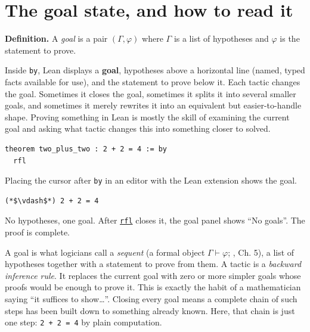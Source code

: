 \section{The goal state, and how to read it}\label{sec:05-tactics:01-goal-state:1}

\textbf{Definition.} A \emph{goal} is a pair \((\Gamma, \varphi)\) where \(\Gamma\) is a list of hypotheses and \(\varphi\) is the statement to prove.

Inside \texttt{by}, Lean displays a \textbf{goal}, hypotheses above a horizontal line (named, typed facts available for use), and the statement to prove below it. Each tactic changes the goal. Sometimes it closes the goal, sometimes it splits it into several smaller goals, and sometimes it merely rewrites it into an equivalent but easier-to-handle shape. Proving something in Lean is mostly the skill of examining the current goal and asking what tactic changes this into something closer to solved.

\begin{lstlisting}
theorem two_plus_two : 2 + 2 = 4 := by
  rfl
\end{lstlisting}

Placing the cursor after \texttt{by} in an editor with the Lean extension shows the goal.

\begin{lstlisting}
(*$\vdash$*) 2 + 2 = 4
\end{lstlisting}

No hypotheses, one goal. After \href{https://lean-lang.org/doc/reference/latest/Tactic-Proofs/Tactic-Reference/}{\texttt{rfl}} closes it, the goal panel shows ``No goals''. The proof is complete.

\begin{mathreading}

A goal is what logicians call a \emph{sequent} (a formal object \(\Gamma \vdash \varphi\); \cite{Pierce2002}, Ch. 5), a list of hypotheses together with a statement to prove from them. A tactic is a \emph{backward inference rule}. It replaces the current goal with zero or more simpler goals whose proofs would be enough to prove it. This is exactly the habit of a mathematician saying ``it suffices to show\ldots{}''. Closing every goal means a complete chain of such steps has been built down to something already known. Here, that chain is just one step: \texttt{2 + 2 = 4} by plain computation.

\end{mathreading}

